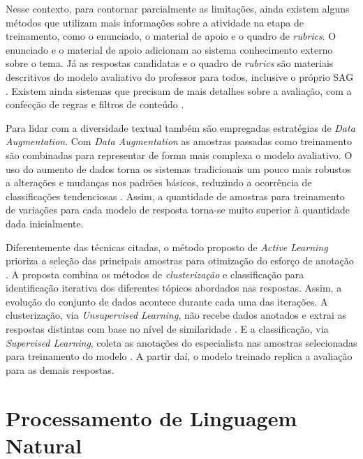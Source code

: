Nesse contexto, para contornar parcialmente as limitações, ainda existem alguns métodos que utilizam mais informações sobre a atividade na etapa de treinamento, como o enunciado, o material de apoio e o quadro de \textit{rubrics}\cite{ramachandran2015b, wang2019}. O enunciado e o material de apoio adicionam ao sistema conhecimento externo sobre o tema. Já as respostas candidatas e o quadro de \textit{rubrics} são materiais descritivos do modelo avaliativo do professor para todos, inclusive o próprio SAG \cite{mizumoto2019, marvaniya2018}. Existem ainda sistemas que precisam de mais detalhes sobre a avaliação, com a confecção de regras e filtros de conteúdo \cite{butcher2010, pribadi2017}.

Para lidar com a diversidade textual também são empregadas estratégias de \textit{Data Augmentation}. Com \textit{Data Augmentation} as amostras passadas como treinamento são combinadas para representar de forma mais complexa o modelo avaliativo. O uso do aumento de dados torna os sistemas tradicionais um pouco mais robustos a alterações e mudanças nos padrões básicos, reduzindo a ocorrência de classificações tendenciosas \cite{kumar2019, lun2020}. Assim, a quantidade de amostras para treinamento de variações para cada modelo de resposta torna-se muito superior à quantidade dada inicialmente.

Diferentemente das técnicas citadas, o método proposto de \textit{Active Learning} prioriza a seleção das principais amostras para otimização do esforço de anotação \cite{kumar2020}. A proposta combina os métodos de \textit{clusterização} \cite{spalenza2019} e classificação \cite{oliveira2014} para identificação iterativa dos diferentes tópicos abordados nas respostas. Assim, a evolução do conjunto de dados acontece durante cada uma das iterações. A clusterização, via \textit{Unsupervised Learning}, não recebe dados anotados e extrai as respostas distintas com base no nível de similaridade \cite{everitt2011}. E a classificação, via \textit{Supervised Learning}, coleta as anotações do especialista nas amostras selecionadas para treinamento do modelo \cite{bishop2006}. A partir daí, o modelo treinado replica a avaliação para as demais respostas.


\section{Processamento de Linguagem Natural}

